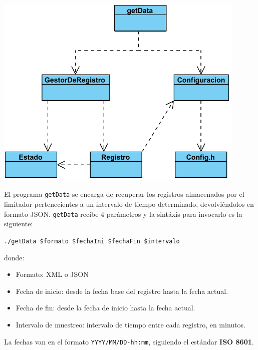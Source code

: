 
\begin{center}
    \includegraphics[width=0.9\textwidth]{figuras/lms11-getData.pdf}
    \label{fig:getData}
\end{center}

El programa \verb|getData| se encarga de recuperar los registros almacenados por el limitador pertenecientes a un intervalo de tiempo determinado, devolviéndolos en formato JSON. \verb|getData| recibe 4 parámetros y la sintáxis para invocarlo es la siguiente: \\

\begin{center}
    \verb|./getData $formato $fechaIni $fechaFin $intervalo|
\end{center}

donde:

\begin{itemize}
    \item Formato: \acrshort{XML} o \acrshort{JSON}
    \item Fecha de inicio: desde la fecha base del registro hasta la fecha actual.
    \item Fecha de fin: desde la fecha de inicio hasta la fecha actual.
    \item Intervalo de muestreo: intervalo de tiempo entre cada registro, en minutos.
\end{itemize}
La fechas van en el formato \verb|YYYY/MM/DD-hh:mm|, siguiendo el estándar \textbf{ISO 8601}.

